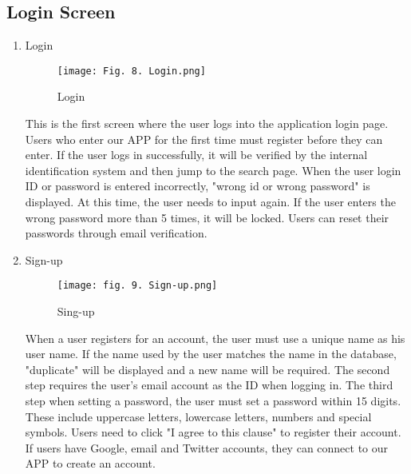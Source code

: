 \documentclass[conference]{IEEEtran}
\begin{document}
\subsection{Login Screen}
\begin{enumerate}
    
    \item Login
    \begin{figure}[h]
    \begin{center}
        \centering
        \texttt{[image: Fig. 8. Login.png]}
        \caption{Login}
        \label{fig:my_label}
    \end{center}
    \end{figure}
    
    This is the first screen where the user logs into the application login page. Users who enter our APP for the first time must register before they can enter. If the user logs in successfully, it will be verified by the internal identification system and then jump to the search page. When the user login ID or password is entered incorrectly, "wrong id or wrong password" is displayed. At this time, the user needs to input again. If the user enters the wrong password more than 5 times, it will be locked. Users can reset their passwords through email verification.\bigskip
    
    \item Sign-up
    \begin{figure}[h]
    \begin{center}
        \centering
        \texttt{[image: fig. 9. Sign-up.png]}
        \caption{Sing-up}
        \label{fig:my_label}
    \end{center}
    \end{figure}
    
    When a user registers for an account, the user must use a unique name as his user name. If the name used by the user matches the name in the database, "duplicate" will be displayed and a new name will be required. The second step requires the user's email account as the ID when logging in. The third step when setting a password, the user must set a password within 15 digits. These include uppercase letters, lowercase letters, numbers and special symbols. Users need to click "I agree to this clause" to register their account. If users have Google, email and Twitter accounts, they can connect to our APP to create an account.\bigskip
    



\end{enumerate}
\end{document}
